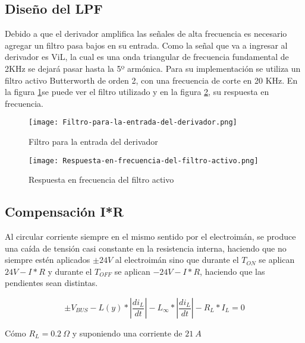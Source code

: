 \subsection{Dise\~{n}o del LPF}

\noindent Debido a que el derivador amplifica las se\~{n}ales de alta frecuencia es necesario agregar un filtro pasa bajos en su entrada. Como la se\~{n}al que va a ingresar al derivador es ViL, la cual es una onda triangular de frecuencia fundamental de 2KHz se dejar\'{a} pasar hasta la 5º arm\'{o}nica. Para su implementaci\'{o}n se utiliza un filtro activo Butterworth de orden 2, con una frecuencia de corte en 20 KHz. En la figura  \ref{fig:img_Filtro-para-la-entrada-del-derivador}se puede ver el filtro utilizado y en la figura \ref{fig:img_Respuesta-en-frecuencia-del-filtro-activo}, su respuesta en frecuencia.

\begin{figure}[H]
	\centering
	\texttt{[image: Filtro-para-la-entrada-del-derivador.png]}
	\caption{Filtro para la entrada del derivador}
	\label{fig:img_Filtro-para-la-entrada-del-derivador}
\end{figure}

\begin{figure}[H]
	\centering
	\texttt{[image: Respuesta-en-frecuencia-del-filtro-activo.png]}
	\caption{Respuesta en frecuencia del filtro activo}
	\label{fig:img_Respuesta-en-frecuencia-del-filtro-activo}
\end{figure}

\subsection{Compensaci\'{o}n I*R}

\noindent Al circular corriente siempre en el mismo sentido por el electroim\'{a}n, se produce una ca\'{i}da de tensi\'{o}n casi constante en la resistencia interna, haciendo que no siempre est\'{e}n aplicados $\pm 24V$ al electroim\'{a}n sino que durante el $T_{ON}$ se aplican $24V-I*R$ y durante el $T_{OFF}$ se aplican $-24V-I*R$, haciendo que las pendientes sean distintas.

\begin{equation} \label{eq_Vbus-didt-RL}
\pm V_{BUS}-L(y)*\left|\frac{{di}_L}{dt}\right|-L_{\infty }*\left|\frac{{di}_L}{dt}\right|-R_L*I_L=0
\end{equation}

\noindent C\'{o}mo  $R_L=0.2\ \mathit{\Omega}$ y suponiendo una corriente de $21\ A$

